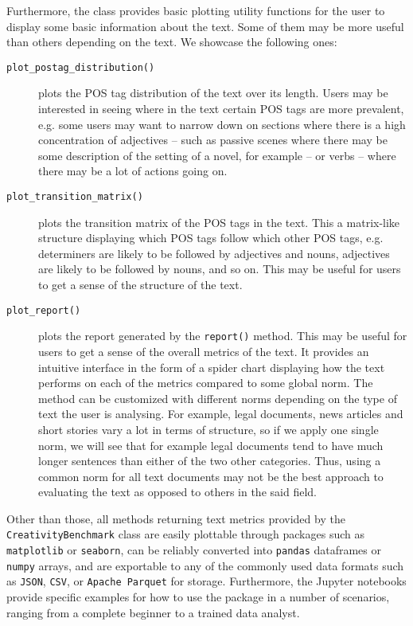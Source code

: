 Furthermore, the class provides basic plotting utility functions for the user to display some basic information about the text. Some of them may be more useful than others depending on the text.
We showcase the following ones:

\begin{description}
    \item[\texttt{plot\_postag\_distribution()}] plots the POS tag distribution of the text over its length. Users may be interested in seeing where in the text certain POS tags are more prevalent, e.g. some users may want to narrow down on sections where there is a high concentration of adjectives -- such as passive scenes where there may be some description of the setting of a novel, for example -- or verbs -- where there may be a lot of actions going on.
    \item[\texttt{plot\_transition\_matrix()}] plots the transition matrix of the POS tags in the text. This a matrix-like structure displaying which POS tags follow which other POS tags, e.g. determiners are likely to be followed by adjectives and nouns, adjectives are likely to be followed by nouns, and so on. This may be useful for users to get a sense of the structure of the text.
    \item[\texttt{plot\_report()}] plots the report generated by the \texttt{report()} method. This may be useful for users to get a sense of the overall metrics of the text. It provides an intuitive interface in the form of a spider chart displaying how the text performs on each of the metrics compared to some global norm. The method can be customized with different norms depending on the type of text the user is analysing. For example, legal documents, news articles and short stories vary a lot in terms of structure, so if we apply one single norm, we will see that for example legal documents tend to have much longer sentences than either of the two other categories. Thus, using a common norm for all text documents may not be the best approach to evaluating the text as opposed to others in the said field.
\end{description}

Other than those, all methods returning text metrics provided by the \texttt{CreativityBenchmark} class are easily plottable through packages such as \texttt{matplotlib} or \texttt{seaborn}, can be reliably converted into \texttt{pandas} dataframes or \texttt{numpy} arrays, and are exportable to any of the commonly used data formats such as \texttt{JSON}, \texttt{CSV}, or \texttt{Apache Parquet} for storage. Furthermore, the Jupyter notebooks provide specific examples for how to use the package in a number of scenarios, ranging from a complete beginner to a trained data analyst.



